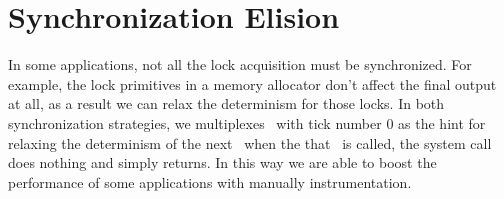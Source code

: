\section{Synchronization Elision} \label{chap:elision}
In some applications, not all the lock acquisition must be synchronized. For example, the lock primitives in a memory allocator don't affect the final output at all, as a result we can relax the determinism for those locks. In both synchronization strategies, we multiplexes \dettick\ with tick number 0 as the hint for relaxing the determinism of the next \detstart\, when the that \detstart\ is called, the system call does nothing and simply returns. In this way we are able to boost the performance of some applications with manually instrumentation.